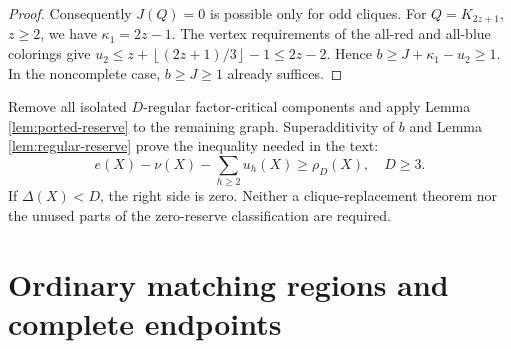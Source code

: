 \documentclass[11pt,a4paper]{article}
\newcommand{\floor}[1]{\left\lfloor#1\right\rfloor}
\theoremstyle{definition}
\begin{document}
\begin{proof}
Consequently $J(Q)=0$ is possible only for odd cliques. For $Q=K_{2z+1}$, $z\ge2$, we have $\kappa_1=2z-1$. The vertex requirements of the all-red and all-blue colorings give
$u_2\le z+\floor{(2z+1)/3}-1\le2z-2$. Hence $b\ge J+\kappa_1-u_2\ge1$. In the noncomplete case, $b\ge J\ge1$ already suffices.
\end{proof}

Remove all isolated $D$-regular factor-critical components and apply Lemma \ref{lem:ported-reserve} to the remaining graph. Superadditivity of $b$ and Lemma \ref{lem:regular-reserve} prove the inequality needed in the text:
\[
\boxed{\ e(X)-\nu(X)-\sum_{h\ge2}u_h(X)\ge\rho_D(X),\quad D\ge3.\ }
\]
If $\Delta(X)<D$, the right side is zero. Neither a clique-replacement theorem nor the unused parts of the zero-reserve classification are required.


\section{Ordinary matching regions and complete endpoints}\label{app:matching}
\end{document}
